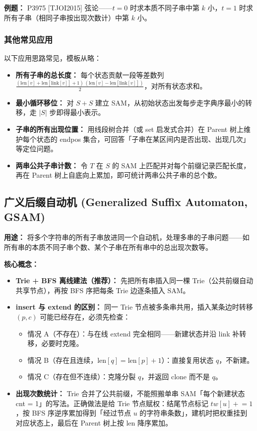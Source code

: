 \textbf{例题：} P3975 [TJOI2015] 弦论——$t=0$ 时求本质不同子串中第 $k$ 小，$t=1$ 时求所有子串（相同子串按出现次数计）中第 $k$ 小。



\subsubsection{其他常见应用}

以下应用思路常见，模板从略：
\begin{itemize}
  \item \textbf{所有子串的总长度：} 每个状态贡献一段等差数列 $\frac{(\text{len}[v] + \text{len}[\text{link}[v]] + 1)\,(\text{len}[v] - \text{len}[\text{link}[v]])}{2}$，对所有状态求和。
  \item \textbf{最小循环移位：} 对 $S + S$ 建立 SAM，从初始状态出发每步走字典序最小的转移，走 $|S|$ 步即得最小表示。
  \item \textbf{子串的所有出现位置：} 用线段树合并（或 set 启发式合并）在 Parent 树上维护每个状态的 endpos 集合，可回答「子串在某区间内是否出现、出现几次」等定位问题。
  \item \textbf{两串公共子串计数：} 令 $T$ 在 $S$ 的 SAM 上匹配并对每个前缀记录匹配长度，再在 Parent 树上自底向上累加，即可统计两串公共子串的总个数。
\end{itemize}

\subsection{广义后缀自动机 (Generalized Suffix Automaton, GSAM)}

\textbf{用途：} 将多个字符串的所有子串放进同一个自动机，处理多串的子串问题——如所有串的本质不同子串个数、某个子串在所有串中的总出现次数等。

\textbf{核心概念：}
\begin{itemize}
  \item \textbf{Trie + BFS 离线建法（推荐）：} 先把所有串插入同一棵 Trie（公共前缀自动共享节点），再按 BFS 序把每条 Trie 边逐条插入 SAM。
  \item \textbf{insert 与 extend 的区别：} 同一 Trie 节点被多条串共用，插入某条边时转移 $(p, c)$ 可能已经存在，必须先检查：
    \begin{itemize}
      \item 情况 A（不存在）：与在线 extend 完全相同——新建状态并沿 link 补转移，必要时克隆。
      \item 情况 B（存在且连续，$\text{len}[q] = \text{len}[p] + 1$）：直接复用状态 $q$，不新建。
      \item 情况 C（存在但不连续）：克隆分裂 $q$，并返回 clone 而不是 $q$。
    \end{itemize}
  \item \textbf{出现次数统计：} Trie 合并了公共前缀，不能照搬单串 SAM「每个新建状态 cnt = 1」的写法。正确做法是给 Trie 节点赋权：结尾节点标记 $tw[u] \mathrel{+}= 1$，按 BFS 序逆序累加得到「经过节点 $u$ 的字符串条数」，建机时把权重挂到对应状态上，最后在 Parent 树上按 len 降序累加。
\end{itemize}


